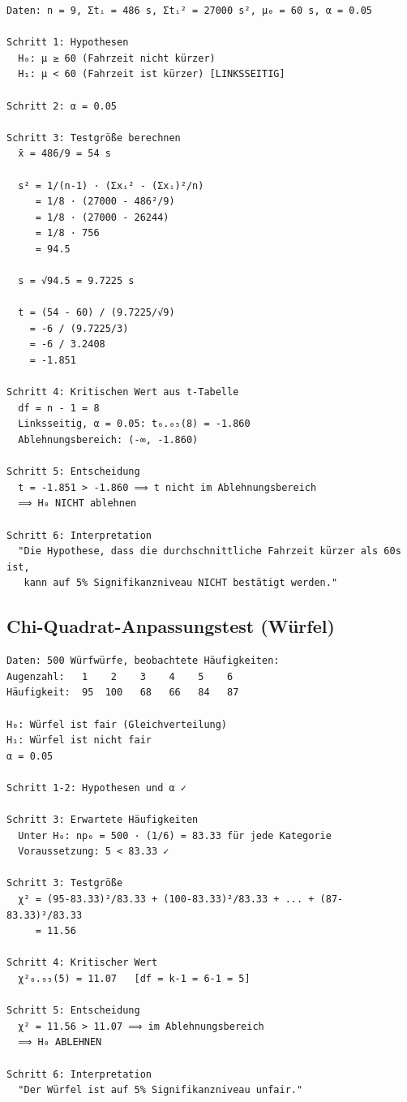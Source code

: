 \documentclass[12pt, a4paper, ngerman]{scrartcl}
\begin{document}
\begin{verbatim}
Daten: n = 9, Σtᵢ = 486 s, Σtᵢ² = 27000 s², μ₀ = 60 s, α = 0.05

Schritt 1: Hypothesen
  H₀: μ ≥ 60 (Fahrzeit nicht kürzer)
  H₁: μ < 60 (Fahrzeit ist kürzer) [LINKSSEITIG]

Schritt 2: α = 0.05

Schritt 3: Testgröße berechnen
  x̄ = 486/9 = 54 s
  
  s² = 1/(n-1) · (Σxᵢ² - (Σxᵢ)²/n)
     = 1/8 · (27000 - 486²/9)
     = 1/8 · (27000 - 26244)
     = 1/8 · 756
     = 94.5
  
  s = √94.5 = 9.7225 s
  
  t = (54 - 60) / (9.7225/√9)
    = -6 / (9.7225/3)
    = -6 / 3.2408
    = -1.851

Schritt 4: Kritischen Wert aus t-Tabelle
  df = n - 1 = 8
  Linksseitig, α = 0.05: t₀.₀₅(8) = -1.860
  Ablehnungsbereich: (-∞, -1.860)

Schritt 5: Entscheidung
  t = -1.851 > -1.860 ⟹ t nicht im Ablehnungsbereich
  ⟹ H₀ NICHT ablehnen

Schritt 6: Interpretation
  "Die Hypothese, dass die durchschnittliche Fahrzeit kürzer als 60s ist,
   kann auf 5% Signifikanzniveau NICHT bestätigt werden."
\end{verbatim}

\subsection{Chi-Quadrat-Anpassungstest (Würfel)}

\begin{verbatim}
Daten: 500 Würfwürfe, beobachtete Häufigkeiten:
Augenzahl:   1    2    3    4    5    6
Häufigkeit:  95  100   68   66   84   87

H₀: Würfel ist fair (Gleichverteilung)
H₁: Würfel ist nicht fair
α = 0.05

Schritt 1-2: Hypothesen und α ✓

Schritt 3: Erwartete Häufigkeiten
  Unter H₀: np₀ = 500 · (1/6) = 83.33 für jede Kategorie
  Voraussetzung: 5 < 83.33 ✓

Schritt 3: Testgröße
  χ² = (95-83.33)²/83.33 + (100-83.33)²/83.33 + ... + (87-83.33)²/83.33
     = 11.56

Schritt 4: Kritischer Wert
  χ²₀.₉₅(5) = 11.07   [df = k-1 = 6-1 = 5]

Schritt 5: Entscheidung
  χ² = 11.56 > 11.07 ⟹ im Ablehnungsbereich
  ⟹ H₀ ABLEHNEN

Schritt 6: Interpretation
  "Der Würfel ist auf 5% Signifikanzniveau unfair."
\end{verbatim}
\end{document}
